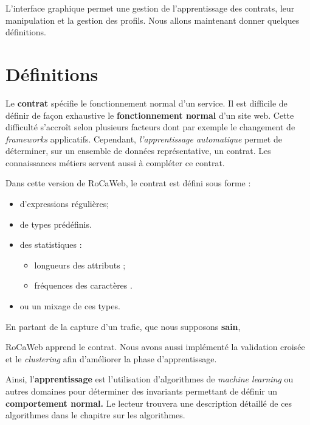 \documentclass[a4paper,10pt,justified,openany]{tufte-book}
\begin{document}
L'interface graphique permet une gestion de l'apprentissage des contrats, leur manipulation et la gestion des profils.
Nous allons maintenant donner quelques définitions. 


\section{Définitions}

Le \textbf{contrat} spécifie le fonctionnement normal d'un service. Il est difficile de définir de façon exhaustive le \textbf{fonctionnement normal} d'un site web. 
Cette difficulté s’accroît selon plusieurs facteurs dont par exemple le changement de \textit{frameworks} applicatifs. 
Cependant, \textit{l'apprentissage automatique} permet de déterminer, sur un ensemble de données représentative, un contrat. Les connaissances métiers servent aussi à compléter ce contrat. 

Dans cette version de RoCaWeb, le contrat est défini sous forme :
\begin{itemize}
\item d'expressions régulières;
\item de types prédéfinis.
\item des  statistiques : 
\begin{itemize}
 \item longueurs des attributs ; 
 \item fréquences des caractères .
\end{itemize}

\item ou un mixage de ces types. 
\end{itemize}

En partant de la capture d'un trafic, que nous supposons \textbf{sain}, 
 
RoCaWeb apprend le contrat. Nous avons aussi implémenté la validation croisée et le \textit{clustering} afin d'améliorer la phase d'apprentissage.
 
Ainsi, l'\textbf{apprentissage} est l'utilisation d'algorithmes de \textit{machine learning} 
ou autres domaines pour déterminer des invariants permettant de définir un \textbf{comportement normal.}
Le lecteur trouvera une description détaillé de ces algorithmes dans le chapitre sur les algorithmes. 
 
\end{document}
